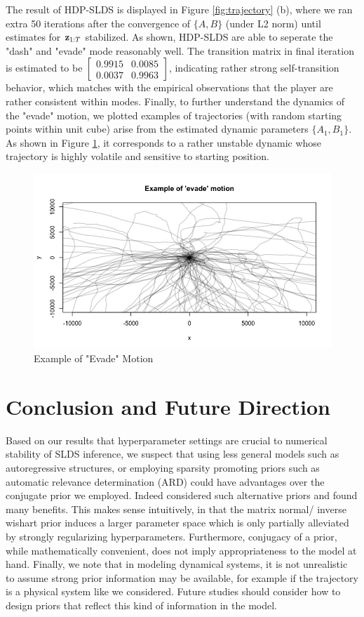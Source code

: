 \documentclass{article} %
\begin{document}
The result of HDP-SLDS is displayed in Figure \ref{fig:trajectory} (b), where we ran extra 50 iterations after the convergence of $\{A, B\}$ (under L2 norm) until estimates for ${\bf z}_{1:T}$ stabilized. As shown, HDP-SLDS are able to seperate the "dash" and "evade" mode reasonably well. The transition matrix in final iteration is estimated to be 
$\begin{bmatrix} 0.9915 & 0.0085 \\ 0.0037 & 0.9963 \end{bmatrix}$, indicating rather strong self-transition behavior, which matches with the empirical observations that the player are rather consistent within modes. Finally, to further understand the dynamics of the "evade" motion, we plotted examples of trajectories (with random starting points within unit cube) arise from the estimated dynamic parameters $\{A_1, B_{1}\}$. As shown in Figure \ref{fig:evade}, it corresponds to a rather unstable dynamic whose trajectory is highly volatile and sensitive to starting position.

\begin{figure}[!h]
\centering
\includegraphics[width=0.7\linewidth]{"./plot/slds/evade"}
\caption{Example of "Evade" Motion}
\label{fig:evade}
\end{figure}

\section{Conclusion and Future Direction}

Based on our results that hyperparameter settings are crucial to numerical stability of SLDS inference, we suspect that using less general models such as autoregressive structures, or employing sparsity promoting priors such as automatic relevance determination (ARD) could have advantages over the conjugate prior we employed. Indeed \cite{fox_bayesian_2009} considered such alternative priors and found many benefits. This makes sense intuitively, in that the matrix normal/ inverse wishart prior induces a larger parameter space which is only partially alleviated by strongly regularizing hyperparameters. Furthermore, conjugacy of a prior, while mathematically convenient, does not imply appropriateness to the model at hand. Finally, we note that in modeling dynamical systems, it is not unrealistic to assume strong prior information may be available, for example if the trajectory is a physical system like we considered. Future studies should consider how to design priors that reflect this kind of information in the model.
\end{document}
